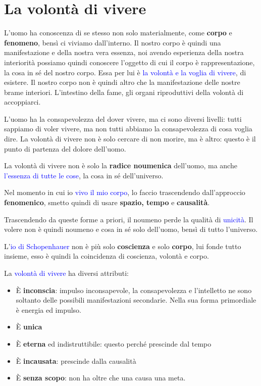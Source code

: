 \documentclass[a4paper, twoside, titlepage]{book}
\renewcommand{\emph}[1]{\textcolor{blue}{#1}}
\begin{document}
\chapter{La volontà di vivere}

L’uomo ha conoscenza di se stesso non solo materialmente, come \textbf{corpo} e \textbf{fenomeno}, bensì ci viviamo dall’interno. Il nostro corpo è quindi una manifestazione e della nostra vera essenza, noi avendo esperienza della nostra interiorità possiamo quindi conoscere l’oggetto di cui il corpo è rappresentazione, la cosa in sé del nostro corpo. Essa per lui è \emph{la volontà e la voglia di vivere}, di esistere. Il nostro corpo non è quindi altro che la manifestazione delle nostre brame interiori. L’intestino della fame, gli organi riproduttivi della volontà di accoppiarci.

L’uomo ha la consapevolezza del dover vivere, ma ci sono diversi livelli: tutti sappiamo di voler vivere, ma non tutti abbiamo la consapevolezza di cosa voglia dire.
La volontà di vivere non è solo cercare di non morire, ma è altro: questo è il punto di partenza del dolore dell’uomo.

La volontà di vivere non è solo la \textbf{radice noumenica} dell’uomo, ma anche \emph{l’essenza di tutte le cose}, la cosa in sé dell’universo.

Nel momento in cui io \emph{vivo il mio corpo}, lo faccio trascendendo dall’approccio \textbf{fenomenico}, smetto quindi di usare \textbf{spazio, tempo} e \textbf{causalità}.

Trascendendo da queste forme a priori, il noumeno perde la qualità di \emph{unicità}. Il volere non è quindi noumeno e cosa in sé solo dell’uomo, bensì di tutto l’universo.

L’\emph{io di Schopenhauer} non è più solo \textbf{coscienza} e solo \textbf{corpo}, lui fonde tutto insieme, esso è quindi la coincidenza di coscienza, volontà e corpo.

La \emph{volontà di vivere} ha diversi attributi:
\begin{itemize}
\item È \textbf{inconscia}: impulso inconsapevole, la consapevolezza e l’intelletto ne sono soltanto delle possibili manifestazioni secondarie. Nella sua forma primordiale è energia ed impulso.
\item È \textbf{unica}
\item È \textbf{eterna} ed indistruttibile: questo perché prescinde dal tempo
\item È \textbf{incausata}: prescinde dalla causalità
\item È \textbf{senza scopo}: non ha oltre che una causa una meta.
\end{itemize}
\end{document}

